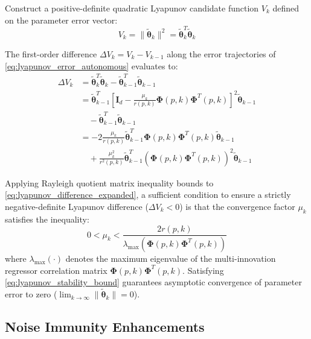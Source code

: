 Construct a positive-definite quadratic Lyapunov candidate function $V_k$ defined on the parameter error vector:
\begin{equation}
V_k = \|\tilde{\boldsymbol{\theta}}_k\|^2 = \tilde{\boldsymbol{\theta}}_k^T \tilde{\boldsymbol{\theta}}_k
\label{eq:lyapunov_candidate}
\end{equation}

The first-order difference $\Delta V_k = V_k - V_{k-1}$ along the error trajectories of \eqref{eq:lyapunov_error_autonomous} evaluates to:
\begin{align}
\Delta V_k &= \tilde{\boldsymbol{\theta}}_k^T \tilde{\boldsymbol{\theta}}_k - \tilde{\boldsymbol{\theta}}_{k-1}^T \tilde{\boldsymbol{\theta}}_{k-1} \nonumber \\
&= \tilde{\boldsymbol{\theta}}_{k-1}^T \left[ \mathbf{I}_d - \frac{\mu_k}{r(p, k)} \boldsymbol{\Phi}(p, k) \boldsymbol{\Phi}^T(p, k) \right]^2 \tilde{\boldsymbol{\theta}}_{k-1} \nonumber \\
&\quad - \tilde{\boldsymbol{\theta}}_{k-1}^T \tilde{\boldsymbol{\theta}}_{k-1} \nonumber \\
&= -2 \frac{\mu_k}{r(p, k)} \tilde{\boldsymbol{\theta}}_{k-1}^T \boldsymbol{\Phi}(p, k) \boldsymbol{\Phi}^T(p, k) \tilde{\boldsymbol{\theta}}_{k-1} \nonumber \\
&\quad + \frac{\mu_k^2}{r^2(p, k)} \tilde{\boldsymbol{\theta}}_{k-1}^T \left( \boldsymbol{\Phi}(p, k) \boldsymbol{\Phi}^T(p, k) \right)^2 \tilde{\boldsymbol{\theta}}_{k-1}
\label{eq:lyapunov_difference_expanded}
\end{align}

Applying Rayleigh quotient matrix inequality bounds to \eqref{eq:lyapunov_difference_expanded}, a sufficient condition to ensure a strictly negative-definite Lyapunov difference ($\Delta V_k < 0$) is that the convergence factor $\mu_k$ satisfies the inequality:
\begin{equation}
0 < \mu_k < \frac{2 r(p, k)}{\lambda_{\max}\left( \boldsymbol{\Phi}(p, k) \boldsymbol{\Phi}^T(p, k) \right)}
\label{eq:lyapunov_stability_bound}
\end{equation}
where $\lambda_{\max}(\cdot)$ denotes the maximum eigenvalue of the multi-innovation regressor correlation matrix $\boldsymbol{\Phi}(p, k) \boldsymbol{\Phi}^T(p, k)$. Satisfying \eqref{eq:lyapunov_stability_bound} guarantees asymptotic convergence of parameter error to zero ($\lim_{k \to \infty} \|\tilde{\boldsymbol{\theta}}_k\| = 0$).


\subsection{Noise Immunity Enhancements}
\label{subsec:cf_misg_noise}

